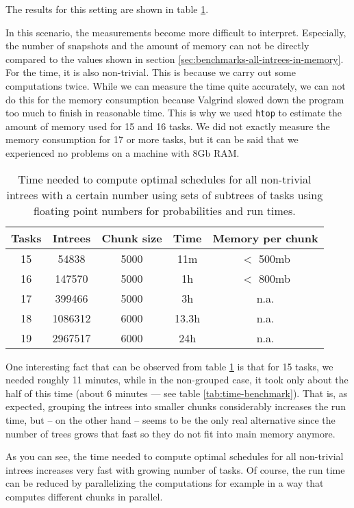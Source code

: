 The results for this setting are shown in table \ref{tab:benchmark-clustered-run-time}.

In this scenario, the measurements become more difficult to interpret. Especially, the number of snapshots and the amount of memory can not be directly compared to the values shown in section \ref{sec:benchmarks-all-intrees-in-memory}. For the time, it is also non-trivial. This is because we carry out some computations twice. While we can measure the time quite accurately, we can not do this for the memory consumption because Valgrind slowed down the program too much to finish in reasonable time. This is why we used \texttt{htop} to estimate the amount of memory used for 15 and 16 tasks. We did not exactly measure the memory consumption for 17 or more tasks, but it can be said that we experienced no problems on a machine with 8Gb RAM.

\begin{table}[ht]
  \centering
  \begin{tabular}[ht]{ccccc}
    Tasks & Intrees & Chunk size & Time & Memory per chunk \\
    \hline
    15 & 54838 & 5000 & 11m & $<$ 500mb \\
    16 & 147570 & 5000 & 1h & $<$ 800mb \\
    17 & 399466 & 5000 & 3h & n.a. \\
    18 & 1086312 & 6000 & 13.3h & n.a. \\
    19 & 2967517 & 6000 & 24h & n.a.
  \end{tabular}
  \caption{Time needed to compute optimal schedules for all non-trivial intrees  with a certain number using sets of subtrees of tasks using floating point numbers for probabilities and run times.}
  \label{tab:benchmark-clustered-run-time}
\end{table}

One interesting fact that can be observed from table \ref{tab:benchmark-clustered-run-time} is that for 15 tasks, we needed roughly 11 minutes, while in the non-grouped case, it took only about the half of this time (about 6 minutes --- see table \ref{tab:time-benchmark}). That is, as expected, grouping the intrees into smaller chunks considerably increases the run time, but -- on the other hand -- seems to be the only real alternative since the number of trees grows that fast so they do not fit into main memory anymore.

As you can see, the time needed to compute optimal schedules for all non-trivial intrees increases very fast with growing number of tasks. Of course, the run time can be reduced by parallelizing the computations for example in a way that computes different chunks in parallel.

